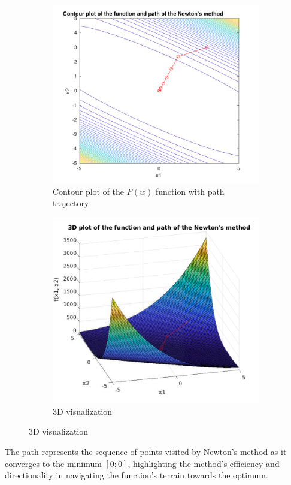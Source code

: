 \begin{figure}[H]
	\centering
	\begin{subfigure}{0.45\textwidth}
		\includegraphics[width=\textwidth]{../Problem 2/contour_plot.pdf}
		\caption{Contour plot of the $F(w)$ function with path trajectory}
	\end{subfigure}
	\quad
	\begin{subfigure}{0.5\textwidth}
		\includegraphics[width=\textwidth]{../Problem 2/3D_plot.pdf}
		\caption{3D visualization}
	\end{subfigure}
\end{figure}
\vspace{3mm}
The path represents the sequence of points visited by Newton's method as it converges to the minimum $[0; 0]$, highlighting the method's efficiency and directionality in navigating the function's terrain towards the optimum.\\

